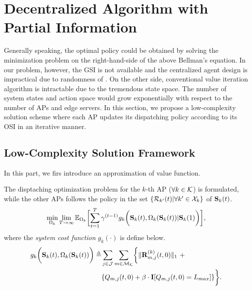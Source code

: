 \section{Decentralized Algorithm with Partial Information}
Generally speaking, the optimal policy could be obtained by solving the minimization problem on the right-hand-side of the above Bellman's equation. %
In our problem, however, the GSI is not available and the centralized agent design is impractical due to randomness of \brlatency.
On the other side, conventional value iteration algorithm is intractable due to the tremendous state space.
The number of system states and action space would grow exponentially with respect to the number of APs and edge servers.
In this section, we propose a low-complexity solution scheme where each AP updates its dispatching policy according to its OSI in an iterative manner.

\subsection{Low-Complexity Solution Framework}
In this part, we firs introduce an approximation of value function.



\begin{problem}
    The disptaching optimization problem for the $k$-th AP ($\forall k\in\mathcal{K}$) is formulated, while the other APs follows the policy in the set $\{ \mathcal{R}_{k'}(t) | \forall k'\in\mathcal{X}_{k} \}$ of $\mathbf{S}_{k}(t)$.
    \begin{align}
        \min_{\Omega_{k}} \lim_{T \to \infty}
            \mathbb{E}_{\Omega_{k}} \Bracket{
                \sum_{t=1}^{T} \gamma^{(t-1)} g_{k}\Paren{\Stat_{k}(t), \Omega_{k}(\Stat_{k}(t)) | \Stat_{k}(1)}
            },
    \end{align}
    where the \emph{system cost function} $g_{k}(\cdot)$ is define below.
    \begin{align}
        g_{k}\Paren{\Stat_{k}(t), \Omega_{k}(\Stat_{k}(t))} \define
            &\sum_{j\in\jSpace} \sum_{m\in\esSet_{\apSet}} \Brace{
                \Inorm{\vec{R}^{(k)}_{m,j}(t,0)}~+
                \nonumber\\
                &\{ Q_{m,j}(t,0) + \beta \cdot \mat{I}[Q_{m,j}(t,0)=L_{max}] \}
            }.
    \end{align}
    \label{problem_2}
\end{problem}

